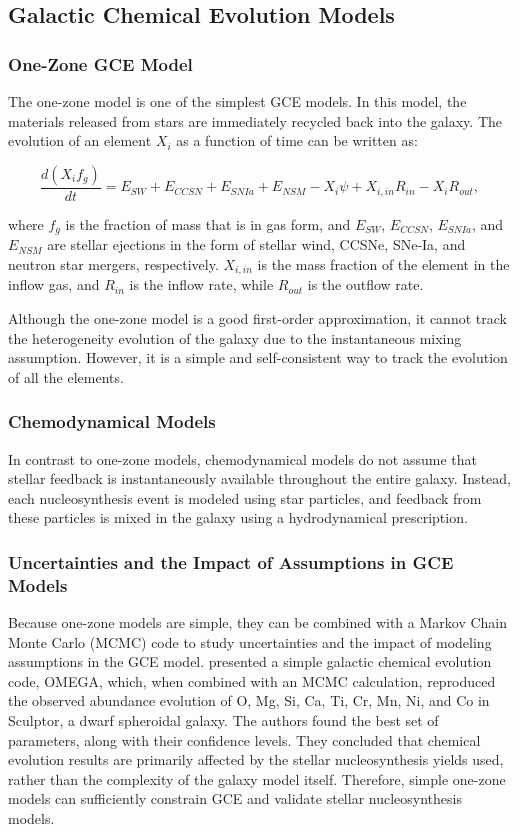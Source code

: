 \documentclass{brandeis-thesis3.2}
\begin{document}
\subsection{Galactic Chemical Evolution Models}

\subsubsection{One-Zone GCE Model}

The one-zone model is one of the simplest GCE models. In this model, the materials released from stars are immediately recycled back into the galaxy. The evolution of an element $X_i$ as a function of time can be written as:

\begin{equation}
\frac{d(X_if_g)}{dt} = E_{SW} + E_{CCSN} + E_{SNIa} + E_{NSM} - X_i\psi + X_{i, in}R_{in} - X_iR_{out},
\end{equation}

where $f_g$ is the fraction of mass that is in gas form, and $E_{SW}$, $E_{CCSN}$, $E_{SNIa}$, and $E_{NSM}$ are stellar ejections in the form of stellar wind, CCSNe, SNe-Ia, and neutron star mergers, respectively. $X_{i, in}$ is the mass fraction of the element in the inflow gas, and $R_{in}$ is the inflow rate, while $R_{out}$ is the outflow rate.

Although the one-zone model is a good first-order approximation, it cannot track the heterogeneity evolution of the galaxy due to the instantaneous mixing assumption. However, it is a simple and self-consistent way to track the evolution of all the elements.

\subsubsection{Chemodynamical Models}

In contrast to one-zone models, chemodynamical models do not assume that stellar feedback is instantaneously available throughout the entire galaxy. Instead, each nucleosynthesis event is modeled using star particles, and feedback from these particles is mixed in the galaxy using a hydrodynamical prescription.

\subsubsection{Uncertainties and the Impact of Assumptions in GCE Models}

Because one-zone models are simple, they can be combined with a Markov Chain Monte Carlo (MCMC) code to study uncertainties and the impact of modeling assumptions in the GCE model. \cite{cote17} presented a simple galactic chemical evolution code, OMEGA, which, when combined with an MCMC calculation, reproduced the observed abundance evolution of O, Mg, Si, Ca, Ti, Cr, Mn, Ni, and Co in Sculptor, a dwarf spheroidal galaxy. The authors found the best set of parameters, along with their confidence levels. They concluded that chemical evolution results are primarily affected by the stellar nucleosynthesis yields used, rather than the complexity of the galaxy model itself. Therefore, simple one-zone models can sufficiently constrain GCE and validate stellar nucleosynthesis models.
\end{document}
